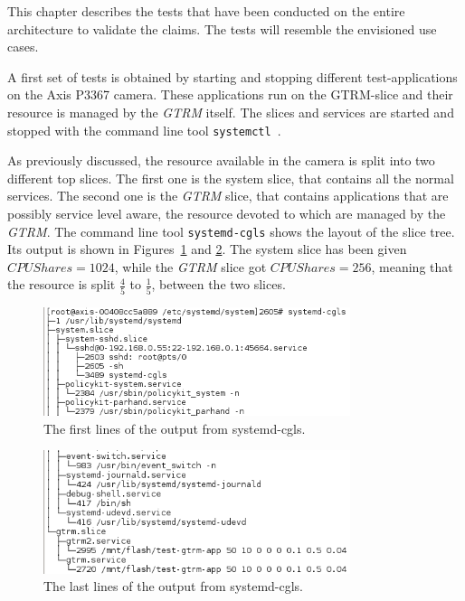 \documentclass[nobiblatex]{LTHthesis}
\begin{document}
This chapter describes the tests that have been conducted on the entire
architecture to validate the claims. The tests will resemble the envisioned
use cases.

A first set of tests is obtained by starting and stopping different 
test-applications on the Axis P3367 camera. These applications run on 
the GTRM-slice and their resource is managed by the \emph{GTRM} itself. The slices
and services are started and stopped with the command line tool 
\texttt{systemctl}~\cite{systemctl}.

As previously discussed, the resource available in the camera is split into
two different top slices. The first one is the system slice, that contains
all the normal services. The second one is the \emph{GTRM} slice, that contains
applications that are possibly service level aware, the resource devoted to
which are managed by the \emph{GTRM}. The command line tool \texttt{systemd-cgls}
shows the layout of the slice tree. Its output is shown in
Figures~\ref{fig:systemd-cgls2a} and \ref{fig:systemd-cgls2b}.
The system slice has been given $CPUShares = 1024$, while the \emph{GTRM} slice got 
$CPUShares = 256$, meaning that the resource is split $\frac{4}{5}$ to 
$\frac{1}{5}$, between the two slices. 

\begin{figure}[h]
	\centering
	\includegraphics[width=0.8\textwidth]{systemd-cgls2}
	\caption{The first lines of the output from  systemd-cgls.}
	\label{fig:systemd-cgls2a}
\end{figure}

\begin{figure}[h]
	\centering
	\includegraphics[width=0.8\textwidth]{systemd-cgls1}
	\caption{The last lines of the output from systemd-cgls.}
	\label{fig:systemd-cgls2b}
\end{figure}
\end{document}
